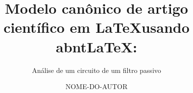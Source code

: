 \documentclass[oneside]{abntlatex}
\title        {Modelo canônico de artigo científico em \LaTeX usando abnt\LaTeX :}
\subtitle     {Análise de um circuito de um filtro passivo}
\author       {NOME-DO-AUTOR}
\date         {\the\year}
\begin{document}
  \pretext%
  \maketitle %

  \coverpage%
  \begin{abstract}%
    \lipsum[1-1]
  \end{abstract}
  \listoffigures%
  \listoftables%
  \tableofcontents%

  \maintext%

  

  

  

  \backtext%
\end{document}
